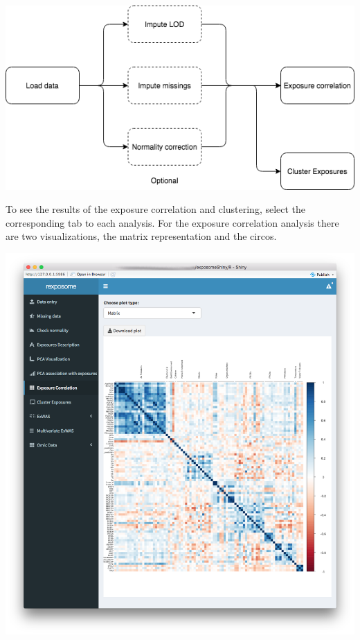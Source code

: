 \documentclass[
]{book}
\begin{document}
\includegraphics{images/analysis6_1.png}

To see the results of the exposure correlation and clustering, select the corresponding tab to each analysis. For the exposure correlation analysis there are two visualizations, the matrix representation and the circos.

\includegraphics{images/analysis6_2.png}
\end{document}
